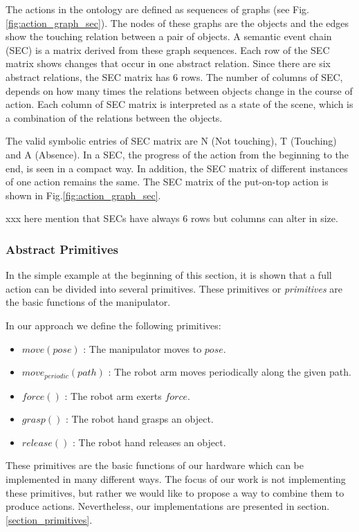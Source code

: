 The actions in the ontology are defined as sequences of graphs (see Fig.\ref{fig:action_graph_sec}).
The nodes of these graphs are the objects and the edges show the touching relation between a pair of objects.
A semantic event chain (SEC) \cite{Aksoy2011} is a matrix derived from these graph sequences.
Each row of the SEC matrix shows changes that occur in one abstract relation.
Since there are six abstract relations, the SEC matrix has 6 rows.
The number of columns of SEC, depends on how many times the relations between objects change in the course of action.
Each column of SEC matrix is interpreted as a state of the scene, which is a combination of the relations between the objects.


The valid symbolic entries of SEC matrix are N (Not touching), T (Touching) and A (Absence).
In a SEC, the progress of the action from the beginning to the end, is seen in a compact way.
In addition, the SEC matrix of different instances of one action remains the same.
The SEC matrix of the put-on-top action is shown in Fig.\ref{fig:action_graph_sec}.

xxx here mention that SECs have always 6 rows but columns can alter in size.


\subsubsection{Abstract Primitives}
\label{sec:abstract_primitives}
In the simple example at the beginning of this section, it is shown that a full action can be divided into several primitives.
These primitives or \textit{primitives} are the basic functions of the manipulator.

In our approach we define the following primitives:
\begin{itemize}
 \item $move(pose)$ :  The manipulator moves to $pose$.
 \item $move_{periodic}(path)$ : The robot arm moves periodically along the given path.
 \item $force()$ : The robot arm exerts $force$.
 \item $grasp()$ : The robot hand grasps an object.
 \item $release()$ : The robot hand releases an object.
\end{itemize}


These primitives are the basic functions of our hardware which can be implemented in many different ways.
The focus of our work is not implementing these primitives,
but rather we would like to propose a way to combine them to produce actions.
Nevertheless, our implementations are presented in section.\ref{section_primitives}.

